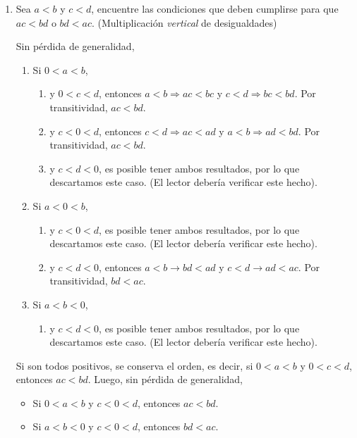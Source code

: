 \begin{enumerate}[label=\alph*)]

 \item Sea $a<b$ y $c<d$, encuentre las condiciones que deben cumplirse para que $ac<bd$ o $bd<ac$. (Multiplicación \textit{vertical} de desigualdades)
 
 Sin pérdida de generalidad,
 \begin{enumerate}[label=\Roman*)]
   \item Si $0<a<b$,
   \begin{enumerate}[label=\roman*)]
    \item y $0<c<d$, entonces $a<b \Rightarrow ac<bc$ y $c<d \Rightarrow bc<bd$. Por transitividad, $ac<bd$.
    \item y $c<0<d$, entonces $c<d \Rightarrow ac < ad$ y $a<b \Rightarrow ad<bd$. Por transitividad, $ac<bd$.
    \item y $c<d<0$,  es posible tener ambos resultados, por lo que descartamos este caso. (El lector debería verificar este hecho).
   \end{enumerate}
   \item Si $a<0<b$,
   \begin{enumerate}[label=\roman*)]
    \item y $c<0<d$, es posible tener ambos resultados, por lo que descartamos este caso. (El lector debería verificar este hecho).
    \item y $c<d<0$, entonces $a<b \rightarrow bd<ad$ y $c<d \rightarrow ad<ac$. Por transitividad, $bd<ac$.
   \end{enumerate}
   \item Si $a<b<0$,
   \begin{enumerate}[label=\roman*)]
    \item y $c<d<0$, es posible tener ambos resultados, por lo que descartamos este caso. (El lector debería verificar este hecho).
   \end{enumerate}
 \end{enumerate}
 
  Si son todos positivos, se conserva el orden, es decir, si $0<a<b$ y $0<c<d$, entonces $ac<bd$. Luego, sin pérdida de generalidad,
 \begin{itemize}
  \item Si $0<a<b$ y $c<0<d$, entonces $ac<bd$.
  \item Si $a<b<0$ y $c<0<d$, entonces $bd<ac$.
 \end{itemize}


\end{enumerate}

